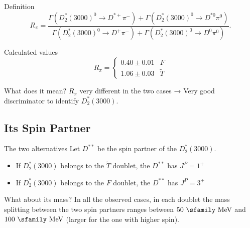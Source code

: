 \documentclass[professionalfonts,aspectratio=169]{beamer}
\begin{document}
\begin{frame}
  \begin{block}{Definition}
    \vspace{0pt}
    \begin{equation*}
      R_\pi = \frac{\Gamma \left( D_2^*(3000)^0 \rightarrow D^{* +} \pi^- \right) + \Gamma \left( D_2^*(3000)^0 \rightarrow D^{* 0} \pi^0 \right)}{\Gamma \left( D_2^*(3000)^0 \rightarrow D^+ \pi^- \right) + \Gamma \left( D_2^*(3000)^0 \rightarrow D^0 \pi^0 \right)} .
    \end{equation*}
  \end{block}
  \pause

  \begin{block}{Calculated values}
    \vspace{0pt}
    \begin{equation*}
      R_\pi =
      \begin{cases}
        0.40 \pm 0.01 & F \\
        1.06 \pm 0.03 & \tilde{T} 
      \end{cases} 
    \end{equation*}
  \end{block}
  \pause
  
  \begin{block}{What does it mean?}
  \vspace{0pt}
    $R_\pi$ very different in the two cases → Very good discriminator to identify $D^*_2(3000)$.
  \end{block}
\end{frame}

\subsection{Its Spin Partner}

\begin{frame}{The two alternatives}
  Let $D^{**}$ be the spin partner of the $D^*_2(3000)$.
  \pause
  \begin{itemize}
    \item
    If $D^*_2(3000)$ belongs to the $\tilde{T}$ doublet, the $D^{**}$ has $J^P = 1^+$
    \item
    If $D^*_2(3000)$ belongs to the $F$ doublet, the $D^{**}$ has $J^P = 3^+$
  \end{itemize}

  \pause
  \begin{block}{What about its mass?}
    \vspace{0pt}
    In all the observed cases, in each doublet the mass splitting between 
    the two spin partners ranges between $50 \ \text{\sfamily MeV}$ and 
    $100 \ \text{\sfamily MeV}$ (larger for the one with higher spin).
    \end{block}
\end{frame}
\end{document}

